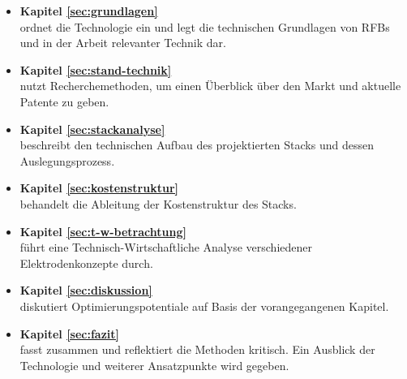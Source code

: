 \begin{onehalfspace}
    \begin{itemize}
        \item \textbf{Kapitel \ref{sec:grundlagen}}\\ordnet die Technologie ein und legt die technischen Grundlagen von \acsp{RFB} und in der Arbeit relevanter Technik dar.
        \item \textbf{Kapitel \ref{sec:stand-technik}}\\nutzt Recherchemethoden, um einen Überblick über den Markt und aktuelle Patente zu geben.
        \item \textbf{Kapitel \ref{sec:stackanalyse}}\\beschreibt den technischen Aufbau des projektierten Stacks und dessen Auslegungsprozess.
        \item \textbf{Kapitel \ref{sec:kostenstruktur}}\\behandelt die Ableitung der Kostenstruktur des Stacks.
        \item \textbf{Kapitel \ref{sec:t-w-betrachtung}}\\führt eine Technisch-Wirtschaftliche Analyse verschiedener Elektrodenkonzepte durch.
        \item \textbf{Kapitel \ref{sec:diskussion}}\\diskutiert Optimierungspotentiale auf Basis der vorangegangenen Kapitel.
        \item \textbf{Kapitel \ref{sec:fazit}}\\fasst zusammen und reflektiert die Methoden kritisch. Ein Ausblick der Technologie und weiterer Ansatzpunkte wird gegeben.
    \end{itemize}
\end{onehalfspace}

